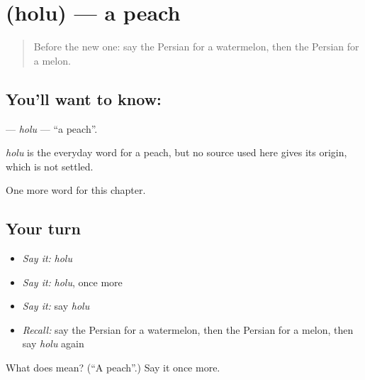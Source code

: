 \section[\texorpdfstring{\fa{هلو} (holu)}{هلو (holu)}]{ (holu) — a peach}

\label{lesson:FA-C99-holu}



\begin{quote}
Before the new one: say the Persian for a watermelon, then the Persian for a melon.
\end{quote}

\subsection*{You'll want to know: }
\textbf{} — \emph{holu} — \textquotedblleft{}a peach\textquotedblright{}.

\begin{cousinweb}
\emph{holu} is the everyday word for a peach, but no source used here gives its origin, which is not settled.
\end{cousinweb}

\begin{grammarlens}[title={What you've built}]
One more word for this chapter.
\end{grammarlens}

\subsection*{Your turn}
\begin{itemize}
\raggedright
  \item \emph{Say it:} \emph{holu}
  \item \emph{Say it:} \emph{holu}, once more
  \item \emph{Say it:} say \emph{holu}
  \item \emph{Recall:} say the Persian for a watermelon, then the Persian for a melon, then say \emph{holu} again
\end{itemize}

\begin{tcolorbox}[breakable,colback=teal!4,colframe=teal!35!black,title={Before you move on}]
What does  mean? (\textquotedblleft{}A peach\textquotedblright{}.) Say it once more.
\end{tcolorbox}
